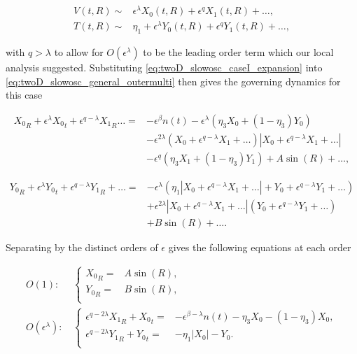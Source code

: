 \begin{equation}\label{eq:twoD_slowosc_caseI_expansion}
\begin{aligned}
V(t,R)\sim& \epsilon^{\lambda} X_0(t,R)+\epsilon^q X_1(t,R)+\ldots,\\
T(t,R)\sim& \eta_1+\epsilon^{\lambda} Y_0(t,R)+\epsilon^q Y_1(t,R)+\ldots,
\end{aligned}
\end{equation}

with $q>\lambda$ to allow for $O(\epsilon^\lambda)$ to be the leading order term which our local analysis suggested. Substituting \eqref{eq:twoD_slowosc_caseI_expansion} into \eqref{eq:twoD_slowosc_general_outermulti} then gives the governing dynamics for this case

\begin{equation*}
\begin{aligned}
 {X_0}_R+\epsilon^{\lambda}{X_0}_t+\epsilon^{q-\lambda} {X_1}_R\ldots={} & -\epsilon^{\beta}n(t)-\epsilon^{\lambda} (\eta_3X_0+(1-\eta_3)Y_0) \\
&-\epsilon^{2\lambda}(X_0+\epsilon^{q-\lambda} X_1+\ldots)|X_0+\epsilon^{q-\lambda} X_1+\ldots|\\
& - \epsilon^{q}(\eta_3X_1+(1-\eta_3)Y_1) + A\sin(R) +\ldots,
\end{aligned}
\end{equation*}

\begin{equation*}
\begin{aligned}
{Y_0}_R+\epsilon^{\lambda}{Y_0}_t+\epsilon^{q-\lambda} {Y_1}_R+\ldots= &-\epsilon^\lambda(\eta_1| X_0 +\epsilon^{q-\lambda} X_1+\ldots|+ Y_0+\epsilon^{q-\lambda} Y_1+\ldots)\\
&+\epsilon^{2\lambda}|X_0 +\epsilon^{q-\lambda} X_1+\ldots|(Y_0+\epsilon^{q-\lambda} Y_1+\ldots)\\
&+ B\sin (R)+\ldots.
\end{aligned}
\end{equation*}

Separating by the distinct orders of $\epsilon$ gives the following equations at each order

\begin{align} \label{eq:twoD_slowosc_caseI_O1}
O(1):\, &\begin{cases}
	{X_0}_R =& A\sin(R), \\
	{Y_0}_R =& B\sin(R),\\
\end{cases}\\ \label{eq:twoD_slowosc_caseI_O2}
O(\epsilon^\lambda): \, & \begin{cases}
	\epsilon^{q-2\lambda}{X_1}_R+{X_0}_t =& -\epsilon^{\beta-\lambda} n(t) -\eta_3 X_0-(1-\eta_3)X_0, \\
	\epsilon^{q-2\lambda}{Y_1}_R+{Y_0}_t =& -\eta_1|X_0|-Y_0.\\
\end{cases}
\end{align}

